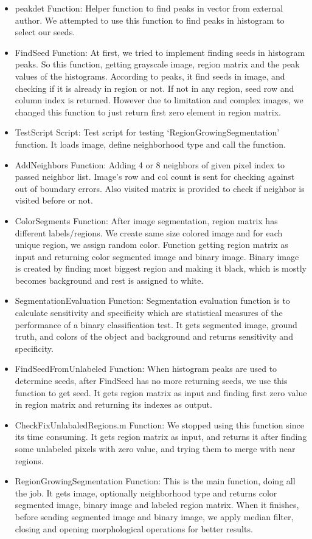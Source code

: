 \documentclass{article}
\begin{document}
		
	\begin{itemize}
		\item peakdet Function: Helper function to find peaks in vector from external author. We attempted to use this function to find peaks in histogram to select our seeds.
		\item FindSeed Function: At first, we tried to implement finding seeds in histogram peaks. So this function, getting grayscale image, region matrix and the peak values of the histograms. According to peaks, it find seeds in image, and checking if it is already in region or not. If not in any region, seed row and column index is returned. However due to limitation and complex images, we changed this function to just return first zero element in region matrix.
		\item TestScript Script: Test script for testing ‘RegionGrowingSegmentation’ function. It loads image, define neighborhood type and call the function.
		\item AddNeighbors Function: Adding 4 or 8 neighbors of given pixel index to passed neighbor list.  Image’s row and col count is sent for checking against out of boundary errors. Also visited matrix is provided to check if neighbor is visited before or not.
		\item ColorSegments Function: After image segmentation, region matrix has different labels/regions. We create same size colored image and for each unique region, we assign random color. Function getting region matrix as input and returning color segmented image and binary image. Binary image is created by finding most biggest region and making it black, which is mostly becomes background and rest is assigned to white.
		\item SegmentationEvaluation Function: Segmentation evaluation function is to calculate sensitivity and specificity which are statistical measures of the performance of a binary classification test. It gets segmented image, ground truth, and colors of the object and background and returns sensitivity and specificity.
		\item FindSeedFromUnlabeled Function: When histogram peaks are used to determine seeds, after FindSeed has no more returning seeds, we use this function to get seed. It gets region matrix as input and finding first zero value in region matrix and returning its indexes as output.
		\item CheckFixUnlabaledRegions.m Function: We stopped using this function since its time consuming. It gets region matrix as input, and returns it after finding some unlabeled pixels with zero value, and trying them to merge with near regions.
		\item RegionGrowingSegmentation Function: This is the main function, doing all the job. It gets image, optionally neighborhood type and returns color segmented image, binary image and labeled region matrix. When it finishes, before sending segmented image and binary image, we apply median filter, closing and opening morphological operations for better results.
		
	\end{itemize}
\end{document}
